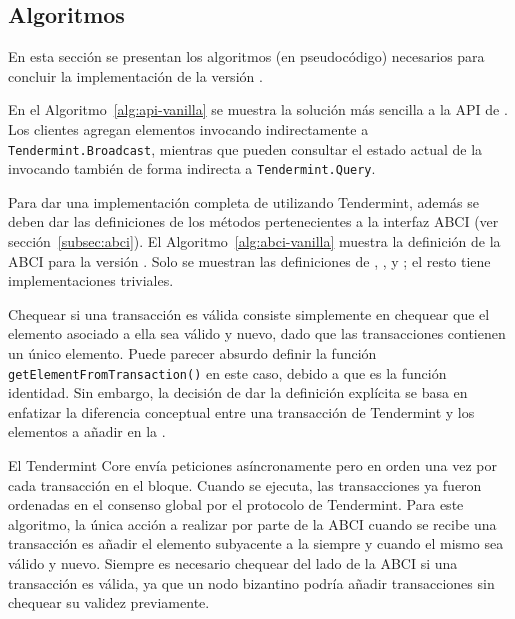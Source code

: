 
\subsection{Algoritmos}

En esta sección se presentan los algoritmos (en pseudocódigo) necesarios para concluir
la implementación de la versión \vanilla.
%


En el Algoritmo~\ref{alg:api-vanilla} se muestra la solución más sencilla a la API
de \setchain.
%
Los clientes agregan elementos invocando indirectamente a
\texttt{Tendermint.Broadcast}, mientras que pueden consultar el estado actual de
la \setchain invocando también de forma indirecta a \texttt{Tendermint.Query}.
%

Para dar una implementación completa de \setchain utilizando Tendermint, además se
deben dar las definiciones de los métodos pertenecientes a la interfaz ABCI
(ver sección~\ref{subsec:abci}). 
%
El Algoritmo~\ref{alg:abci-vanilla} muestra la definición de la ABCI para la versión
\vanilla.
%
Solo se muestran las definiciones de \CheckTx, \DeliverTx, \EndBlock y \Query;
el resto tiene implementaciones triviales.



Chequear si una transacción es válida consiste simplemente en chequear
que el elemento asociado a ella sea válido y nuevo,
dado que las transacciones contienen un único elemento.
%
Puede parecer absurdo definir la función \texttt{getElementFromTransaction()}
en este caso, debido a que es la función identidad. Sin embargo, la decisión de dar
la definición explícita se basa en enfatizar la diferencia conceptual entre una
transacción de Tendermint y los elementos a añadir en la \setchain.
%

El Tendermint Core envía peticiones \DeliverTx asíncronamente pero en orden
una vez por cada transacción en el bloque.
%
Cuando \DeliverTx se ejecuta, las transacciones ya fueron ordenadas en el consenso global por el protocolo
de Tendermint.
%
Para este algoritmo, la única acción a realizar por parte de la ABCI cuando se recibe una
transacción es añadir el elemento subyacente a la \setchain siempre y cuando el mismo
sea válido y nuevo.
%
Siempre es necesario chequear del lado de la ABCI si una transacción es válida,
%
%
ya que un nodo bizantino podría añadir transacciones sin chequear
su validez previamente.
%

